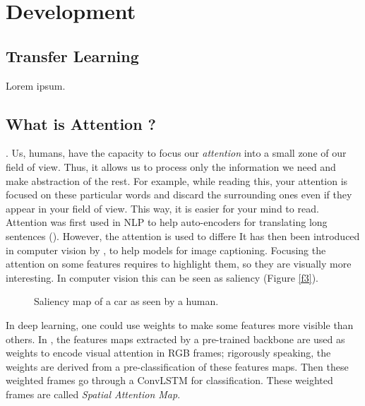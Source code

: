 \documentclass[12pt, a4paper]{report}
\begin{document}
		\section{Development}
			\subsection{Transfer Learning}\label{tl}
				Lorem ipsum.
			
			\subsection{What is Attention ?}\label{attention}
				 \cite{sudhakaran}.
				Us, humans, have the capacity to focus our {\itshape attention} into a small zone of our field of view.
				Thus, it allows us to process only the information we need and make abstraction of the rest.
				For example, while reading this, your attention is focused on these particular words and discard the surrounding ones even if they appear in your field of view.
				This way, it is easier for your mind to read.
				Attention was first used in NLP to help auto-encoders for translating long sentences (\cite{bahdanau}).
				However, the attention is used to differe
				It has then been introduced in computer vision by \cite{xu}, to help models for image captioning.
				Focusing the attention on some features requires to highlight them, so they are visually more interesting.
				In computer vision this can be seen as \gls{saliency} (Figure \ref{f3}).
				\begin{figure}[!tbp]
					\centering
					\caption{Saliency map of a car as seen by a human.}
				\end{figure}
				In deep learning, one could use weights to make some features more visible than others.
				In \cite{sudhakaran_lanz}, the features maps extracted by a pre-trained backbone are used as weights to encode visual attention in RGB frames; rigorously speaking, the weights are derived from a pre-classification of these features maps.
				Then these weighted frames go through a ConvLSTM for classification.
				These weighted frames are called {\itshape Spatial Attention Map}.\\
	
\end{document}

